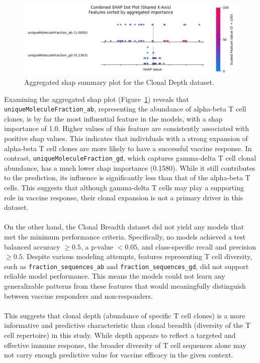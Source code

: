 \documentclass[12pt,a4paper]{report}
\begin{document}
\begin{figure}[h!]
    \centering
    \includegraphics[width=0.85\linewidth]{images/Aggregated_SHAP_Clonal_Depth_selected.png}
    \caption[Aggregated SHAP plot for Clonal Depth]{Aggregated \gls{shap} summary plot for the Clonal Depth dataset.}
    \label{fig:clonal_depth_shap_plot}
\end{figure}
\noindent
Examining the aggregated \gls{shap} plot (Figure~\ref{fig:clonal_depth_shap_plot}) reveals that \texttt{uniqueMoleculeFraction\_ab}, representing the abundance of alpha-beta T cell clones, is by far the most influential feature in the models, with a \gls{shap} importance of 1.0. Higher values of this feature are consistently associated with positive \gls{shap} values. This indicates that individuals with a strong expansion of alpha-beta T cell clones are more likely to have a successful vaccine response. In contrast, \texttt{uniqueMoleculeFraction\_gd}, which captures gamma-delta T cell clonal abundance, has a much lower \gls{shap} importance (0.1580). While it still contributes to the prediction, its influence is significantly less than that of the alpha-beta T cells. This suggests that although gamma-delta T cells may play a supporting role in vaccine response, their clonal expansion is not a primary driver in this dataset.\\
\\
On the other hand, the Clonal Breadth dataset did not yield any models that met the minimum performance criteria. Specifically, no models achieved a test balanced accuracy $\geq 0.5$, a p-value $< 0.05$, and class-specific recall and precision $\geq 0.5$. Despite various modeling attempts, features representing T cell diversity, such as \texttt{fraction\_sequences\_ab} and \texttt{fraction\_sequences\_gd}, did not support reliable model performance. This means the models could not learn any generalizable patterns from these features that would meaningfully distinguish between vaccine responders and non-responders.\\
\\
This suggests that clonal depth (abundance of specific T cell clones) is a more informative and predictive characteristic than clonal breadth (diversity of the T cell repertoire) in this study. While depth appears to reflect a targeted and effective immune response, the broader diversity of T cell sequences alone may not carry enough predictive value for vaccine efficacy in the given context.
\end{document}
